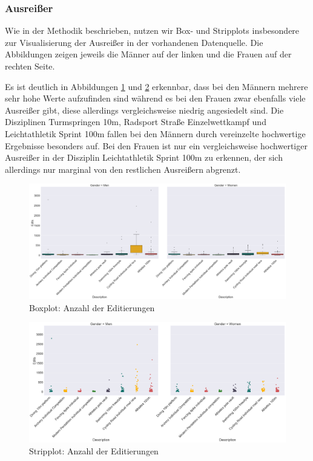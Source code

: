 \documentclass[11pt]{article}
\begin{document}
\subsubsection{Ausreißer}
Wie in der Methodik beschrieben, nutzen wir Box- und Stripplots insbesondere zur Visualisierung der Ausreißer in der vorhandenen Datenquelle. Die Abbildungen zeigen jeweils die Männer auf der linken und die Frauen auf der rechten Seite. 

Es ist deutlich in Abbildungen \ref{fig:editcountBoxPlot} und \ref{fig:editcountStripPlot} erkennbar, dass bei den Männern mehrere sehr hohe Werte aufzufinden sind während es bei den Frauen zwar ebenfalls viele Ausreißer gibt, diese allerdings vergleichsweise niedrig angesiedelt sind. Die Disziplinen Turmspringen 10m, Radsport Straße Einzelwettkampf und  Leichtathletik Sprint 100m fallen bei den Männern durch vereinzelte hochwertige Ergebnisse besonders auf. Bei den Frauen ist nur ein vergleichsweise hochwertiger Ausreißer in der Disziplin Leichtathletik Sprint 100m zu erkennen, der sich allerdings nur marginal von den restlichen Ausreißern abgrenzt. 

\begin{figure}
\includegraphics[width=1\textwidth]{figures/editcount_boxplot.png}
\caption[Boxplot: Anzahl der Editierungen]{Boxplot: Anzahl der Editierungen}
\label{fig:editcountBoxPlot}
\end{figure}

\begin{figure}
\includegraphics[width=1\textwidth]{figures/editcount_stripplot.png}
\caption[Stripplot: Anzahl der Editierungen]{Stripplot: Anzahl der Editierungen}
\label{fig:editcountStripPlot}
\end{figure}
\end{document}
